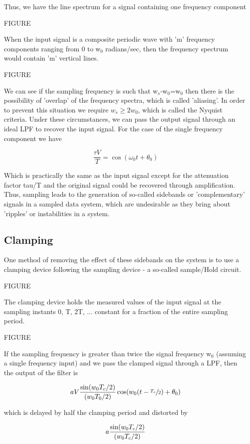 \documentclass[11pt,fleqn]{book} %
\begin{document}
Thus, we have the line spectrum for a signal containing one frequency component

FIGURE

When the input signal is a composite periodic wave with 'm' frequency components ranging from 0 to w$_0$ radians/sec, then the frequency spectrum would contain 'm' vertical lines.

FIGURE

We can see if the sampling frequency is such that w$_s$-w$_0$=w$_0$ then there is the possibility of 'overlap' of the frequency spectra, which is called 'aliasing'. In order to prevent this situation we require $w_s\geq 2w_0$, which is called the Nyquist criteria. Under these circumstances, we can pass the output signal through an ideal LPF to recover the input signal. For the case of the single frequency component we have

$$\frac{\tau V}{T}=\cos(\omega_0t+\theta_0)$$

Which is practically the same as the input signal except for the attenuation factor tau/T and the original signal could be recovered through amplification. Thus, sampling leads to the generation of so-called sidebands or 'complementary' signals in a sampled data system, which are undesirable as they bring about 'ripples' or instabilities in a system.

\subsection{Clamping}

One method of removing the effect of these sidebands on the system is to use a clamping device following the sampling device - a so-called sample/Hold circuit.

FIGURE

The clamping device holds the measured values of the input signal at the sampling instants 0, T, 2T, ... constant for a fraction of the entire sampling period.

FIGURE

If the sampling frequency is greater than twice the signal frequency w$_0$ (assuming a single frequency input) and we pass the clamped signal through a LPF, then the output of the filter is

$$aV{\sin(w_0T_c/2)\over (w_0T_0/2)}\cos(w_0(t-\sfrac{T_c}{2})+\theta_0)$$

which is delayed by half the clamping period and distorted by

$$a{\sin(w_0T_c/2)\over (w_0T_c/2)}$$
\end{document}
